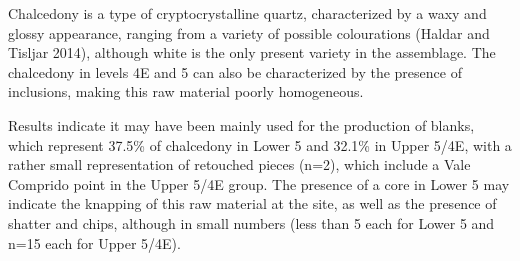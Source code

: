 \documentclass[12pt,twoside]{reedthesis}
\begin{document}
Chalcedony is a type of cryptocrystalline quartz, characterized by a waxy and glossy appearance, ranging from a variety of possible colourations (Haldar and Tisljar 2014), although white is the only present variety in the assemblage. The chalcedony in levels 4E and 5 can also be characterized by the presence of inclusions, making this raw material poorly homogeneous.

Results indicate it may have been mainly used for the production of blanks, which represent 37.5\% of chalcedony in Lower 5 and 32.1\% in Upper 5/4E, with a rather small representation of retouched pieces (n=2), which include a Vale Comprido point in the Upper 5/4E group. The presence of a core in Lower 5 may indicate the knapping of this raw material at the site, as well as the presence of shatter and chips, although in small numbers (less than 5 each for Lower 5 and n=15 each for Upper 5/4E).
\end{document}
